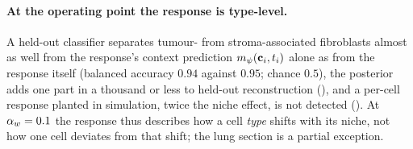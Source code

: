 \paragraph{At the operating point the response is type-level.}
A held-out classifier separates tumour- from stroma-associated fibroblasts almost as well from the response's context prediction $m_{\psi}(\mathbf{c}_i, t_i)$ alone as from the response itself (balanced accuracy $0.94$ against $0.95$; chance $0.5$), the posterior adds one part in a thousand or less to held-out reconstruction (), and a per-cell response planted in simulation, twice the niche effect, is not detected (). At $\alpha_w = 0.1$ the response thus describes how a cell \emph{type} shifts with its niche, not how one cell deviates from that shift; the lung section is a partial exception.
